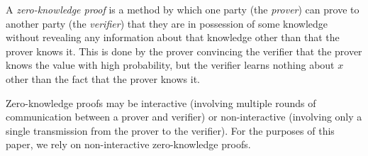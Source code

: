 A \emph{zero-knowledge proof} is a method by which one party (the \emph{prover}) can prove to another party (the \emph{verifier}) that they are in possession of some knowledge without revealing any information about that knowledge other than that the prover knows it. This is done by the prover convincing the verifier that the prover knows the value with high probability, but the verifier learns nothing about $x$ other than the fact that the prover knows it.

Zero-knowledge proofs may be interactive (involving multiple rounds of communication between a prover and verifier) or non-interactive (involving only a single transmission from the prover to the verifier). For the purposes of this paper, we rely on non-interactive zero-knowledge proofs.
